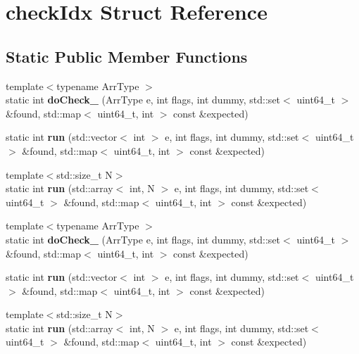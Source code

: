 \hypertarget{structcheck_idx}{}\section{check\+Idx Struct Reference}
\label{structcheck_idx}
\subsection*{Static Public Member Functions}
\begin{DoxyCompactItemize}
\item 
\mbox{\label{structcheck_idx_ac40f014bdbe73e27827fc105d857304c}} 
{\footnotesize template$<$typename Arr\+Type $>$ }\\static int {\bfseries do\+Check\+\_\+} (Arr\+Type e, int flags, int dummy, std\+::set$<$ uint64\+\_\+t $>$ \&found, std\+::map$<$ uint64\+\_\+t, int $>$ const \&expected)
\item 
\mbox{\label{structcheck_idx_a95e51d3d563cf2eef1bf5c83725861bc}} 
static int {\bfseries run} (std\+::vector$<$ int $>$ e, int flags, int dummy, std\+::set$<$ uint64\+\_\+t $>$ \&found, std\+::map$<$ uint64\+\_\+t, int $>$ const \&expected)
\item 
\mbox{\label{structcheck_idx_a99a6f8b6682d28cdec87d7b156cdf041}} 
{\footnotesize template$<$std\+::size\+\_\+t N$>$ }\\static int {\bfseries run} (std\+::array$<$ int, N $>$ e, int flags, int dummy, std\+::set$<$ uint64\+\_\+t $>$ \&found, std\+::map$<$ uint64\+\_\+t, int $>$ const \&expected)
\item 
\mbox{\label{structcheck_idx_ac40f014bdbe73e27827fc105d857304c}} 
{\footnotesize template$<$typename Arr\+Type $>$ }\\static int {\bfseries do\+Check\+\_\+} (Arr\+Type e, int flags, int dummy, std\+::set$<$ uint64\+\_\+t $>$ \&found, std\+::map$<$ uint64\+\_\+t, int $>$ const \&expected)
\item 
\mbox{\label{structcheck_idx_a95e51d3d563cf2eef1bf5c83725861bc}} 
static int {\bfseries run} (std\+::vector$<$ int $>$ e, int flags, int dummy, std\+::set$<$ uint64\+\_\+t $>$ \&found, std\+::map$<$ uint64\+\_\+t, int $>$ const \&expected)
\item 
\mbox{\label{structcheck_idx_a99a6f8b6682d28cdec87d7b156cdf041}} 
{\footnotesize template$<$std\+::size\+\_\+t N$>$ }\\static int {\bfseries run} (std\+::array$<$ int, N $>$ e, int flags, int dummy, std\+::set$<$ uint64\+\_\+t $>$ \&found, std\+::map$<$ uint64\+\_\+t, int $>$ const \&expected)
\end{DoxyCompactItemize}


